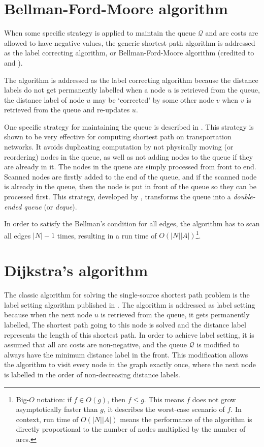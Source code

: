 \section{Bellman-Ford-Moore algorithm} \label{section:labelcorrectingalgorithm}
When some specific strategy is applied to maintain the queue $\mathcal{Q}$
and arc costs are allowed to have negative values,
the generic shortest path algorithm is addressed as the label correcting algorithm,
or Bellman-Ford-Moore algorithm (credited to \citet{Bellman, Ford} and \citet{Moore}).

The algorithm is addressed as the label correcting algorithm
because the distance labels do not get permanently labelled when a node $u$ is retrieved from the queue,
the distance label of node $u$ may be `corrected' by some other node $v$ when $v$ is retrieved from the queue and re-updates $u$.

One specific strategy for maintaining the queue is described in \citet{Sheffi}.
This strategy is shown to be very effective for computing shortest path on transportation networks.
It avoids duplicating computation by not physically moving (or reordering) nodes in the queue,
as well as not adding nodes to the queue if they are already in it.
The nodes in the queue are simply processed from front to end.
Scanned nodes are firstly added to the end of the queue,
and if the scanned node is already in the queue,
then the node is put in front of the queue so they can be processed first.
This strategy, developed by \citet{Pape}, transforms the queue into a \emph{double-ended queue} (or \emph{deque}).

In order to satisfy the Bellman's condition for all edges,
the algorithm has to scan all edges $|N|-1$ times,
resulting in a run time of $O(|N||A|)$\footnote{Big-$O$ notation: if $f \in O(g)$, then $f \leq g$. This means $f $ does not grow asymptotically faster than $g$, it describes the worst-case scenario of $f$. In context, run time of $O(|N||A|)$ means the performance of the algorithm is directly proportional to the number of nodes multiplied by the number of arcs.}.

\section{Dijkstra's algorithm} \label{sec:dijkstra}
The classic algorithm for solving the single-source shortest path problem is the label setting algorithm published in \citet{Dijkstra}.
The algorithm is addressed as label setting because when the next node $u$ is retrieved from the queue,
it gets permanently labelled,
The shortest path going to this node is solved and 
the distance label represents the length of this shortest path.
In order to achieve label setting, 
it is assumed that all arc costs are non-negative,
and the queue $\mathcal{Q}$ is modified to always have the minimum distance label in the front.
This modification allows the algorithm to visit every node in the graph exactly once,
where the next node is labelled in the order of non-decreasing distance labels.

